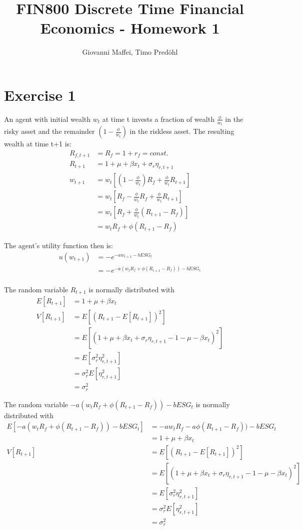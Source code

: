 \documentclass[]{article}
\title{FIN800 Discrete Time Financial Economics - Homework 1}
\author{Giovanni Maffei, Timo Predöhl}
\begin{document}
\maketitle

\section{Exercise 1}
An agent with initial wealth $w_t$ at time t invests a fraction of wealth $\frac{\phi}{w_t}$ in the risky asset and the remainder $(1-\frac{\phi}{w_t})$ in the riskless asset. The resulting wealth at time t+1 is:
\begin{align*}
	R_{f,t+1} &= R_{f} = 1+r_f = const.\\
	R_{t+1} &= 1 + \mu + \beta x_t + \sigma_r \eta_{r, t+1}\\
	w_{t+1} &= w_t[(1-\frac{\phi}{w_t})R_f+\frac{\phi}{w_t} R_{t+1}]\\
	&= w_t[R_f - \frac{\phi}{w_t} R_f + \frac{\phi}{w_t} R_{t+1}]\\
	&= w_t[R_f + \frac{\phi}{w_t} (R_{t+1} - R_f)]\\
	&= w_t R_f + \phi (R_{t+1} - R_f)
\end{align*}

The agent's utility function then is:
\begin{align*}
	u(w_{t+1}) &= -e^{-aw_{t+1} - bESG_t}\\
	&= -e^{-a(w_t R_f + \phi (R_{t+1} - R_f)) - bESG_t}\\
\end{align*}

The random variable $R_{t+1}$ is normally distributed with 
\begin{align*}
	E[R_{t+1}] &= 1+\mu+\beta x_t\\
	V[R_{t+1}] &= E[(R_{t+1} - E[R_{t+1}])^2]\\
	&= E[(1 + \mu + \beta x_t + \sigma_r \eta_{r, t+1} - 1 - \mu - \beta x_t)^2]\\
	&= E[\sigma_r^2 \eta_{r, t+1}^2]\\
	&= \sigma_r^2 E[\eta_{r, t+1}^2]\\
	&= \sigma_r^2
\end{align*}

The random variable $-a(w_t R_f + \phi (R_{t+1} - R_f)) - bESG_t$ is normally distributed with 
\begin{align*}
	E[-a(w_t R_f + \phi (R_{t+1} - R_f)) - bESG_t] &= -aw_t R_f -a \phi (R_{t+1} - R_f)) - bESG_t\\
	&= 1+\mu+\beta x_t\\
	V[R_{t+1}] &= E[(R_{t+1} - E[R_{t+1}])^2]\\
	&= E[(1 + \mu + \beta x_t + \sigma_r \eta_{r, t+1} - 1 - \mu - \beta x_t)^2]\\
	&= E[\sigma_r^2 \eta_{r, t+1}^2]\\
	&= \sigma_r^2 E[\eta_{r, t+1}^2]\\
	&= \sigma_r^2
\end{align*}
\end{document}
